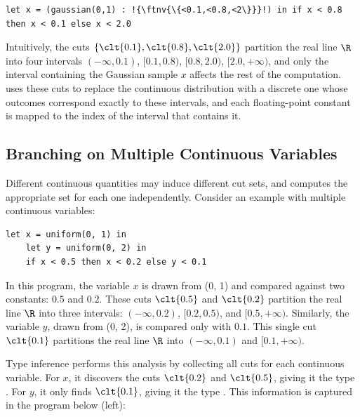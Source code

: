 \begin{lstlisting}[aboveskip=1em,belowskip=1em,escapechar=!,gobble=4]
    let x = (gaussian(0,1) : !{\ftnv{\{<0.1,<0.8,<2\}}}!) in if x < 0.8 then x < 0.1 else x < 2.0
\end{lstlisting}

\noindent Intuitively, the cuts $\{\clt{0.1}, \clt{0.8}, \clt{2.0}\}$ partition the real line $\R$ into four intervals $(-\infty, 0.1)$, $[0.1, 0.8)$, $[0.8, 2.0)$, $[2.0, +\infty)$, and only the interval containing the Gaussian sample $x$ affects the rest of the computation. \Slice{} uses these cuts to replace the continuous distribution with a discrete one whose outcomes correspond exactly to these intervals, and each floating-point constant is mapped to the index of the interval that contains it.

\subsection{Branching on Multiple Continuous Variables}\label{sec:examples:2}

\noindent Different continuous quantities may induce different cut sets, and \Slice{} computes the appropriate set for each one independently. Consider an example with multiple continuous variables:

\begin{lstlisting}[aboveskip=1em,belowskip=1em,gobble=4]
    let x = uniform(0, 1) in
    let y = uniform(0, 2) in
    if x < 0.5 then x < 0.2 else y < 0.1
\end{lstlisting}

\noindent In this program, the variable $x$ is drawn from \uniform(0, 1) and compared against two constants: $0.5$ and $0.2$. These cuts $\clt{0.5}$ and $\clt{0.2}$ partition the real line $\R$ into three intervals: $(-\infty, 0.2)$, $[0.2, 0.5)$, and $[0.5, +\infty)$. Similarly, the variable $y$, drawn from \uniform(0, 2), is compared only with $0.1$. This single cut $\clt{0.1}$ partitions the real line $\R$ into $(-\infty, 0.1)$ and $[0.1, +\infty)$.

Type inference performs this analysis by collecting all cuts for each continuous variable. For $x$, it discovers the cuts $\clt{0.2}$ and $\clt{0.5}$, giving it the type . For $y$, it only finds $\clt{0.1}$, giving it the type . This information is captured in the program below (left):

